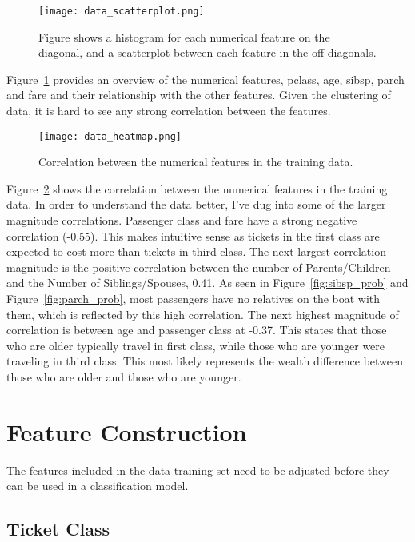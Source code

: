 \documentclass[12pt, letterpaper]{article}
\begin{document}
\begin{figure}[H]
    \centering
    \texttt{[image: data\_scatterplot.png]}
    \caption{Figure shows a histogram for each numerical feature on the diagonal, and a scatterplot between each feature in the off-diagonals.}
    \label{fig:data_scatter}
\end{figure}


Figure~\ref{fig:data_scatter} provides an overview of the numerical features, pclass, age, sibsp, parch and fare and their relationship with the other features. Given the clustering of data, it is hard to see any strong correlation between the features. 

\begin{figure}[H]
    \centering
    \texttt{[image: data\_heatmap.png]}
    \caption{Correlation between the numerical features in the training data. }
    \label{fig:data_heatmap}
\end{figure}

Figure~\ref{fig:data_heatmap} shows the correlation between the numerical features in the training data. In order to understand the data better, I've dug into some of the larger magnitude correlations. Passenger class and fare have a strong negative correlation (-0.55). This makes intuitive sense as tickets in the first class are expected to cost more than tickets in third class. The next largest correlation magnitude is the positive correlation between the number of Parents/Children and the Number of Siblings/Spouses, 0.41. As seen in Figure~\ref{fig:sibsp_prob} and Figure~\ref{fig:parch_prob}, most passengers have no relatives on the boat with them, which is reflected by this high correlation. The next highest magnitude of correlation is between age and passenger class at -0.37. This states that those who are older typically travel in first class, while those who are younger were traveling in third class. This most likely represents the wealth difference between those who are older and those who are younger. 

\section{Feature Construction}

The features included in the data training set need to be adjusted before they can be used in a classification model.  

\subsection{Ticket Class}
\end{document}
